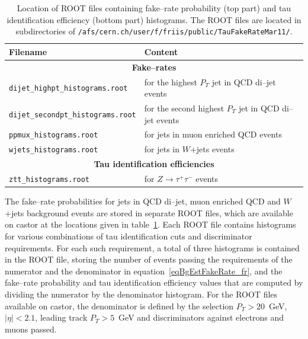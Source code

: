 \begin{table}[t]
\begin{center}
\tablesize
\begin{tabular}{|l|l|}
\hline
Filename & Content \\
\hline
\hline
\multicolumn{2}{|c|}{\textbf{Fake--rates}} \\
\hline
{\tt dijet\_highpt\_histograms.root} & for the highest $P_{T}$ jet in QCD di--jet events \\
{\tt dijet\_secondpt\_histograms.root} & for the second highest $P_{T}$ jet in QCD di--jet events \\
{\tt ppmux\_histograms.root} & for jets in muon enriched QCD events \\
{\tt wjets\_histograms.root} & for jets in $W$+jets events \\
\hline
\hline
\multicolumn{2}{|c|}{\textbf{Tau identification efficiencies}} \\
\hline
{\tt ztt\_histograms.root} & for $Z \rightarrow \tau^{+} \tau^{-}$ events \\
\hline
\end{tabular}
\end{center}
\begin{center}
\caption{\captiontext Location of ROOT files containing fake--rate probability (top part)
         and tau identification efficiency (bottom part) histograms.
         The ROOT files are located in subdirectories of {\tt /afs/cern.ch/user/f/friis/public/TauFakeRateMar11/}.}
\label{tabBgEstFakeRate_HistogramCastorLocations}
\end{center}
\end{table}

The fake--rate probabilities for jets in QCD di--jet, muon enriched QCD and $W$+jets background events
are stored in separate ROOT files, which are available on castor at the locations 
given in table~\ref{tabBgEstFakeRate_HistogramCastorLocations}.
Each ROOT file contains histograms for various combinations of tau identification cuts and discriminator requirements.
For each such requirement, a total of three histograms is contained in the ROOT file,
storing the number of events passing the requirements of the numerator and the denominator in equation~\ref{eqBgEstFakeRate_fr},
and the fake--rate probability and tau identification efficiency values that are
computed by dividing the numerator by the denominator histogram.
For the ROOT files available on castor,
the denominator is defined by the selection $P_{T} > 20$~GeV, $\vert\eta\vert < 2.1$,
leading track $P_{T} > 5$~GeV and discriminators against electrons and muons passed.

